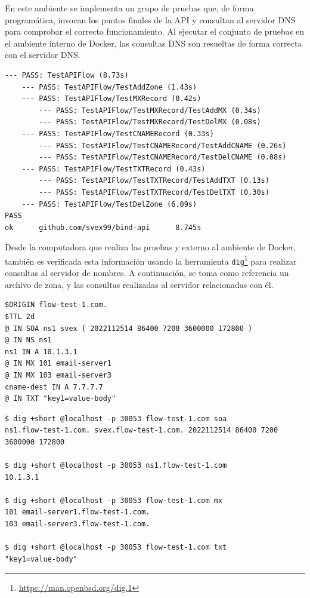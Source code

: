 En este ambiente se implementa un grupo de pruebas que, de forma programática, invocan los puntos finales de la API y consultan al servidor DNS para comprobar el correcto funcionamiento. Al ejecutar el conjunto de pruebas en el ambiente interno de Docker, las consultas DNS son resueltas de forma correcta con el servidor DNS. 

\begin{lstlisting}[frame=single, numbers=none, caption=Resultados del conjunto de pruebas \textit{end-to-end}.]
--- PASS: TestAPIFlow (8.73s)
    --- PASS: TestAPIFlow/TestAddZone (1.43s)
    --- PASS: TestAPIFlow/TestMXRecord (0.42s)
        --- PASS: TestAPIFlow/TestMXRecord/TestAddMX (0.34s)
        --- PASS: TestAPIFlow/TestMXRecord/TestDelMX (0.08s)
    --- PASS: TestAPIFlow/TestCNAMERecord (0.33s)
        --- PASS: TestAPIFlow/TestCNAMERecord/TestAddCNAME (0.26s)
        --- PASS: TestAPIFlow/TestCNAMERecord/TestDelCNAME (0.08s)
    --- PASS: TestAPIFlow/TestTXTRecord (0.43s)
        --- PASS: TestAPIFlow/TestTXTRecord/TestAddTXT (0.13s)
        --- PASS: TestAPIFlow/TestTXTRecord/TestDelTXT (0.30s)
    --- PASS: TestAPIFlow/TestDelZone (6.09s)
PASS
ok      github.com/svex99/bind-api      8.745s
\end{lstlisting}

Desde la computadora que realiza las pruebas y externo al ambiente de Docker, también es verificada esta información usando la herramienta \verb|dig|\footnote{\url{https://man.openbsd.org/dig.1}} para realizar consultas al servidor de nombres. A continuación, se toma como referencia un archivo de zona, y las consultas realizadas al servidor relacionadas con él.

\begin{lstlisting}[frame=single, numbers=none, caption=Archivo de registros para la zona \textbf{flow-test-1.com} servida por el servidor de BIND 9.]
$ORIGIN flow-test-1.com.
$TTL 2d
@ IN SOA ns1 svex ( 2022112514 86400 7200 3600000 172800 )
@ IN NS ns1
ns1 IN A 10.1.3.1
@ IN MX 101 email-server1
@ IN MX 103 email-server3
cname-dest IN A 7.7.7.7
@ IN TXT "key1=value-body"
\end{lstlisting}

\begin{lstlisting}[frame=single, numbers=none, caption=Consulta externas realizadas al servidor para la zona \textbf{flow-test-1.com}.]
$ dig +short @localhost -p 30053 flow-test-1.com soa
ns1.flow-test-1.com. svex.flow-test-1.com. 2022112514 86400 7200 3600000 172800

$ dig +short @localhost -p 30053 ns1.flow-test-1.com
10.1.3.1

$ dig +short @localhost -p 30053 flow-test-1.com mx 
101 email-server1.flow-test-1.com.
103 email-server3.flow-test-1.com.

$ dig +short @localhost -p 30053 flow-test-1.com txt 
"key1=value-body"
\end{lstlisting}

